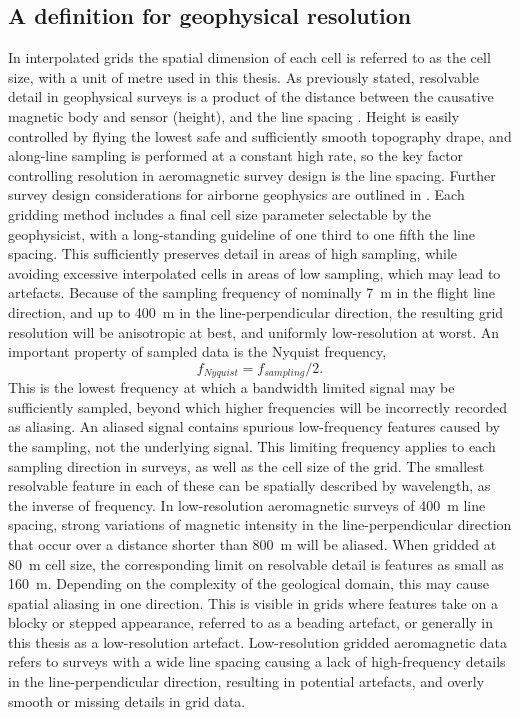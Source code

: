 \subsection{A definition for geophysical resolution}
In interpolated grids the spatial dimension of each cell is referred to as the cell size, with a unit of metre used in this thesis.
As previously stated, resolvable detail in geophysical surveys is a product of the distance between the causative magnetic body and sensor (height), and the line spacing \parencite{islesRelationshipsGeologicalResolution1992,islesGeologicalInterpretationAeromagnetic2018,dentithGeophysicsMineralExploration2014}.
Height is easily controlled by flying the lowest safe and sufficiently smooth topography drape, and along-line sampling is performed at a constant high rate, so the key factor controlling resolution in aeromagnetic survey design is the line spacing.
Further survey design considerations for airborne geophysics are outlined in \textcite{goodwinAirborneMagneticRadiometric2023,islesGeologicalInterpretationAeromagnetic2018,reidAeromagneticSurveyDesign1980}.
Each gridding method includes a final cell size parameter selectable by the geophysicist, with a long-standing guideline of one third to one fifth the line spacing.
This sufficiently preserves detail in areas of high sampling, while avoiding excessive interpolated cells in areas of low sampling, which may lead to artefacts.
Because of the sampling frequency of nominally \qty{7}{\m} in the flight line direction, and  up to \qty{400}{\m} in the line-perpendicular direction, the resulting grid resolution will be anisotropic at best, and uniformly low-resolution at worst.
An important property of sampled data is the Nyquist frequency, \[f_{Nyquist} = f_{sampling} / 2.\]
This is the lowest frequency at which a bandwidth limited signal may be sufficiently sampled, beyond which higher frequencies will be incorrectly recorded as aliasing.
An aliased signal contains spurious low-frequency features caused by the sampling, not the underlying signal.
This limiting frequency applies to each sampling direction in surveys, as well as the cell size of the grid.
The smallest resolvable feature in each of these can be spatially described by wavelength, as the inverse of frequency.
In low-resolution aeromagnetic surveys of \qty{400}{\m} line spacing, strong variations of magnetic intensity in the line-perpendicular direction  that occur over a distance shorter than \qty{800}{\m} will be aliased.
When gridded at \qty{80}{\m} cell size, the corresponding limit on resolvable detail is features as small as \qty{160}{\m}.
Depending on the complexity of the geological domain, this may cause spatial aliasing in one direction.
This is visible in grids where features take on a blocky or stepped appearance, referred to as a beading artefact, or generally in this thesis as a low-resolution artefact.
Low-resolution gridded aeromagnetic data refers to surveys with a wide line spacing causing a lack of high-frequency details in the line-perpendicular direction, resulting in potential artefacts, and overly smooth or missing details in grid data.

